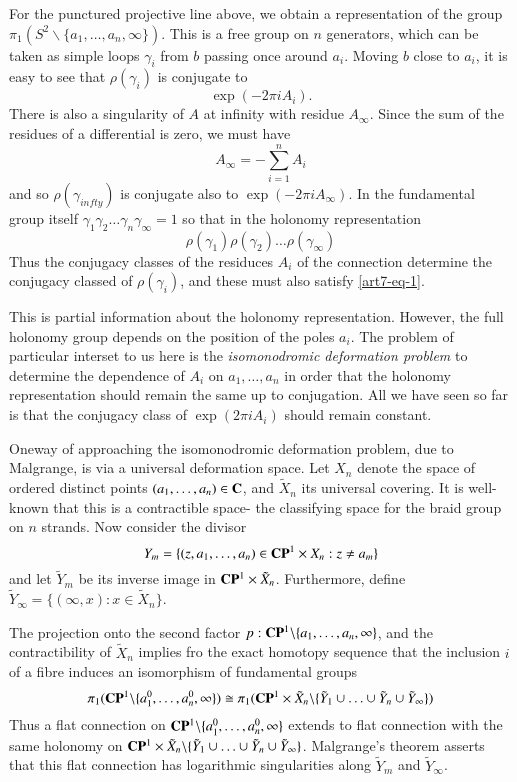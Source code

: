 For the punctured projective line above, we obtain a representation of the group $\pi_{1}(S^{2}\backslash \{a_{1}, \ldots, a_{n}, \infty\})$. This is a free group on $n$ generators, which can be taken as simple loops $\gamma_{i}$ from $b$ passing once around $a_{i}$. Moving $b$ close to $a_{i}$, it is easy to see that $ \rho(\gamma_{i})$ is conjugate to
$$
\exp(-2\pi iA_{i}).
$$
There is also a singularity of $A$ at infinity with residue $A_{\infty}$. Since the sum of the residues of a differential is zero, we must have
$$
A_{\infty} = -\sum\limits_{i=1}^{n}A_{i}
$$
and so $\rho(\gamma_{infty})$ is conjugate also to $\exp(-2\pi i A_{\infty})$. In the fundamental group itself $\gamma_{1} \gamma_{2}\ldots \gamma_{n}\gamma_{\infty} =1$ so that in the holonomy representation
\begin{equation*}\label{art7-eq-1}
\rho(\gamma_{1})\rho(\gamma_{2})\ldots \rho(\gamma_{\infty})\tag{1}
\end{equation*}
Thus the conjugacy classes of the residuces $A_{i}$ of the connection determine the conjugacy classed of
$\rho(\gamma_{i})$, and these must also satisfy \eqref{art7-eq-1}. 

This is partial information about the holonomy representation. However, the full holonomy group depends on the position of the poles $a_{i}$. The problem of particular interset to us here is the \textit{isomonodromic deformation problem} to determine the dependence of $A_{i}$ on $a_{1}, \ldots, a_{n}$ in order that the holonomy representation should remain the same up to conjugation. All we have seen so far is that the conjugacy class of $\exp(2\pi iA_{i})$ should remain constant.

One\pageoriginale way of approaching the isomonodromic deformation problem, due to Malgrange, is via a universal deformation space. Let $X_{n}$ denote the space of ordered distinct points $(a_{1}, \ldots, a_{n}) \in \mathbf{C}$, and $\tilde{X}_{n}$ its universal covering. It is well-known that this is a contractible space- the classifying space for the braid group on $n$ strands. Now consider the divisor
$$
Y_{m}= \{(z,a_{1}, \ldots , a_{n}) \in \mathbf{C}\mathbf{P}^{1} \times X_{n}: z \neq a_{m}\}
$$
and let $\tilde{Y}_{m}$ be its inverse image in $\mathbf{C}\mathbf{P}^{1} \times \tilde{X}_{n}$. Furthermore,
define $\tilde{Y}_{\infty} = \{(\infty, x) : x \in \tilde{X}_{n}\}$.

The projection onto the second factor $p : \mathbf{C}\mathbf{P}^{1} \backslash \{a_{1}, \ldots ,a_{n}, \infty\}$, and the contractibility of $\tilde{X}_{n}$ implies fro  the exact homotopy sequence that the inclusion $i$ of a fibre induces an isomorphism of fundamental groups
$$
\pi_{1}(\mathbf{C}\mathbf{P}^{1} \backslash \{a_{1}^{0}, \ldots, a_{n}^{0}, \infty\})\cong \pi_{1} (\mathbf{C}\mathbf{P}^{1} \times \tilde{X}_{n} \backslash \{\tilde{Y}_{1} \cup \ldots\cup \tilde{Y}_{n}\cup  \tilde{Y}_{\infty}\})
$$
Thus a flat connection on $\mathbf{C}\mathbf{P}^{1}\backslash \{a_{1}^{0}, \ldots, a_{n}^{0}, \infty\}$ extends to flat connection  with the same holonomy on $\mathbf{C}\mathbf{P}^{1} \times \tilde{X}_{n} \backslash \{\tilde{Y}_{1} \cup \ldots\cup \tilde{Y}_{n} \cup  \tilde{Y}_{\infty}\}$. Malgrange's theorem asserts that this flat connection has logarithmic singularities along $\tilde{Y}_{m}$ and $\tilde{Y}_{\infty}$.

